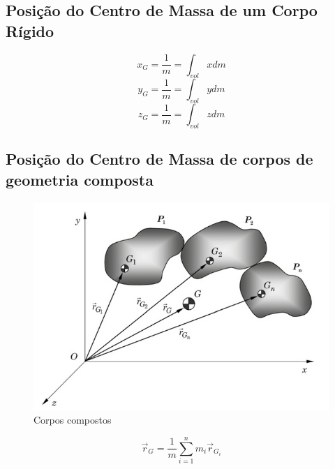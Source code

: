\documentclass[a4paper, 12pt]{article}
\begin{document}
	\subsection{Posição do Centro de Massa de um Corpo Rígido}
		\begin{equation}
			x_G = \frac{1}{m} = \int_{vol}xdm
		\end{equation}
		\begin{equation}
			y_G = \frac{1}{m} = \int_{vol}ydm
		\end{equation}
		\begin{equation}
			z_G = \frac{1}{m} = \int_{vol}zdm
		\end{equation}
	\subsection{Posição do Centro de Massa de corpos de geometria composta}
		\begin{figure}[h]
			\center
			\includegraphics[scale=0.5]{imagens/a.png} 
			\caption{Corpos compostos}
		\end{figure}	
		\newpage
		\begin{equation}
			\vec{r}_G = \frac{1}{m}\sum^n_{i = 1}m_i\vec{r}_{G_i}
		\end{equation}
\end{document}
